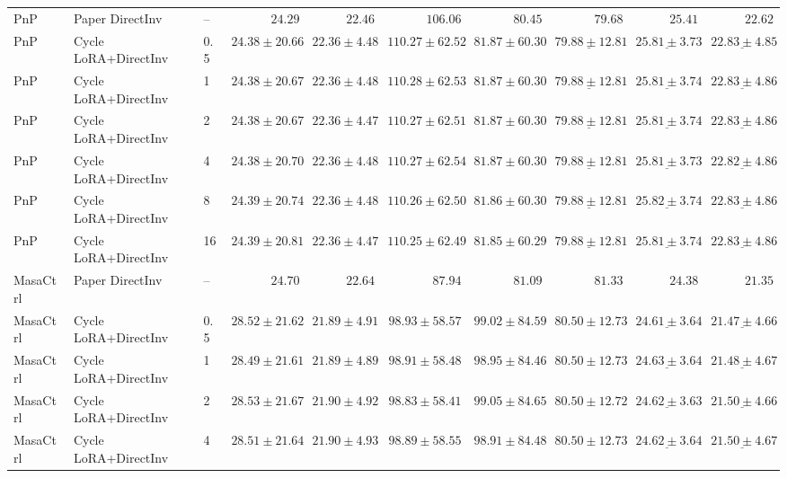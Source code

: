 \documentclass{article}
\begin{document}
\begin{table}[htbp]
{\begin{tabular}{lllrrrrrrr}
    \midrule
    PnP & Paper DirectInv & -- & $\mathbf{24.29}$ & $\mathbf{22.46}$ & $\mathbf{106.06}$ & $\mathbf{80.45}$ & $79.68$ & $25.41$ & $22.62$ \tabularnewline
    PnP & Cycle LoRA+DirectInv & 0.5 & $\mathit{24.38 \pm 20.66}$ & $22.36 \pm 4.48$ & $110.27 \pm 62.52$ & $81.87 \pm 60.30$ & $\underline{79.88 \pm 12.81}$ & $\underline{25.81 \pm 3.73}$ & $\underline{22.83 \pm 4.85}$ \tabularnewline
    \rowcolor{cyclebaseline} PnP & Cycle LoRA+DirectInv & 1 & $24.38 \pm 20.67$ & $22.36 \pm 4.48$ & $110.28 \pm 62.53$ & $81.87 \pm 60.30$ & $\underline{79.88 \pm 12.81}$ & $\underline{25.81 \pm 3.74}$ & $\underline{\mathbf{\mathit{22.83 \pm 4.86}}}$ \tabularnewline
    PnP & Cycle LoRA+DirectInv & 2 & $24.38 \pm 20.67$ & $22.36 \pm 4.47$ & $110.27 \pm 62.51$ & $81.87 \pm 60.30$ & $\underline{79.88 \pm 12.81}$ & $\underline{25.81 \pm 3.74}$ & $\underline{22.83 \pm 4.86}$ \tabularnewline
    PnP & Cycle LoRA+DirectInv & 4 & $24.38 \pm 20.70$ & $22.36 \pm 4.48$ & $110.27 \pm 62.54$ & $81.87 \pm 60.30$ & $\underline{79.88 \pm 12.81}$ & $\underline{25.81 \pm 3.73}$ & $\underline{22.82 \pm 4.86}$ \tabularnewline
    PnP & Cycle LoRA+DirectInv & 8 & $24.39 \pm 20.74$ & $22.36 \pm 4.48$ & $110.26 \pm 62.50$ & $81.86 \pm 60.30$ & $\underline{79.88 \pm 12.81}$ & $\underline{\mathbf{\mathit{25.82 \pm 3.74}}}$ & $\underline{22.83 \pm 4.86}$ \tabularnewline
    PnP & Cycle LoRA+DirectInv & 16 & $24.39 \pm 20.81$ & $\mathit{22.36 \pm 4.47}$ & $\mathit{110.25 \pm 62.49}$ & $\mathit{81.85 \pm 60.29}$ & $\underline{\mathbf{\mathit{79.88 \pm 12.81}}}$ & $\underline{25.81 \pm 3.74}$ & $\underline{22.83 \pm 4.86}$ \tabularnewline
    \midrule
    MasaCtrl & Paper DirectInv & -- & $\mathbf{24.70}$ & $\mathbf{22.64}$ & $\mathbf{87.94}$ & $\mathbf{81.09}$ & $\mathbf{81.33}$ & $24.38$ & $21.35$ \tabularnewline
    MasaCtrl & Cycle LoRA+DirectInv & 0.5 & $28.52 \pm 21.62$ & $21.89 \pm 4.91$ & $98.93 \pm 58.57$ & $99.02 \pm 84.59$ & $80.50 \pm 12.73$ & $\underline{24.61 \pm 3.64}$ & $\underline{21.47 \pm 4.66}$ \tabularnewline
    \rowcolor{cyclebaseline} MasaCtrl & Cycle LoRA+DirectInv & 1 & $28.49 \pm 21.61$ & $21.89 \pm 4.89$ & $98.91 \pm 58.48$ & $98.95 \pm 84.46$ & $80.50 \pm 12.73$ & $\underline{24.63 \pm 3.64}$ & $\underline{21.48 \pm 4.67}$ \tabularnewline
    MasaCtrl & Cycle LoRA+DirectInv & 2 & $28.53 \pm 21.67$ & $21.90 \pm 4.92$ & $98.83 \pm 58.41$ & $99.05 \pm 84.65$ & $80.50 \pm 12.72$ & $\underline{24.62 \pm 3.63}$ & $\underline{21.50 \pm 4.66}$ \tabularnewline
    MasaCtrl & Cycle LoRA+DirectInv & 4 & $28.51 \pm 21.64$ & $\mathit{21.90 \pm 4.93}$ & $98.89 \pm 58.55$ & $98.91 \pm 84.48$ & $80.50 \pm 12.73$ & $\underline{24.62 \pm 3.64}$ & $\underline{\mathbf{\mathit{21.50 \pm 4.67}}}$ \tabularnewline

\end{tabular}}
\end{table}
\end{document}
